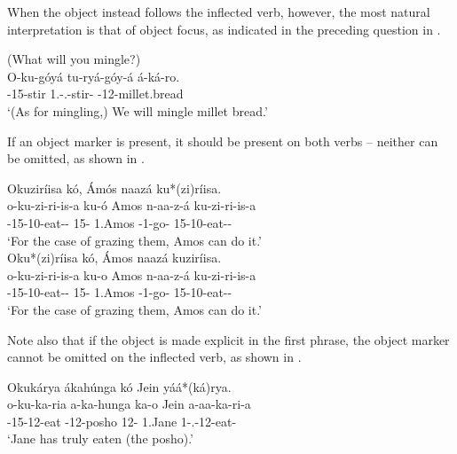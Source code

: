\documentclass[output=paper]{langscibook}
\begin{document}
\z

When the object instead follows the inflected verb, however, the most natural interpretation is that of object focus, as indicated in the preceding question in .

\ea
\label{bkm:Ref98835146}
(What will you mingle?)\\
\gll
O-ku-góyá  tu-ryá-góy-á  á-ká-ro.\\
\AUG{}-15-stir  1\PL{}.\SM{}-\N.\FUT{}-stir-\FV{}  \AUG{}-12-millet.bread\\
\glt
‘(As for mingling,) We will mingle millet bread.’\\


\z

If an object marker is present, it should be present on both verbs – neither can be omitted, as shown in .

\ea
\label{bkm:Ref98836854}
\ea
Okuziríisa kó, \'{A}mós naazá ku*(zi)ríisa.\\
\gll
o-ku-zi-ri-is-a  ku-ó  Amos  n-aa-z-á  ku-zi-ri-is-a\\
\AUG{}-15-10\OM{}-eat-\CAUS{}-\FV{}  15-\CM{}  1.Amos  \IPFV{}-1\SM{}-go-\FV{}  15-10\OM{}-eat-\CAUS{}-\FV{}\\
\glt
‘For the case of grazing them, Amos can do it.’\\

\ex
Oku*(zi)ríisa kó, \'{A}mos naazá kuziríisa.\\
\gll
o-ku-zi-ri-is-a  ku-o  Amos  n-aa-z-á  ku-zi-ri-is-a\\
\AUG{}-15-10\OM{}-eat-\CAUS{}-\FV{}  15-\CM{}  1.Amos  \IPFV{}-1\SM{}-go-\FV{}  15-10\OM{}-eat-\CAUS{}-\FV{}\\
\glt
‘For the case of grazing them, Amos can do it.’\\

\z
\z

Note also that if the object is made explicit in the first phrase, the object marker cannot be omitted on the inflected verb, as shown in .

\ea
\label{bkm:Ref116295118}
Okukárya ákahúnga kó Jein yáá*(ká)rya.\\
\gll
o-ku-ka-ria  a-ka-hunga  ka-o  Jein  a-aa-ka-ri-a\\
\AUG{}-15-12-eat  \AUG{}-12-posho  12-\CM{}  1.Jane  1\SM{}-\N{}.\PST{}-12\OM{}-eat-\FV{}\\
\glt
‘Jane has truly eaten (the posho).’\\
\end{document}
